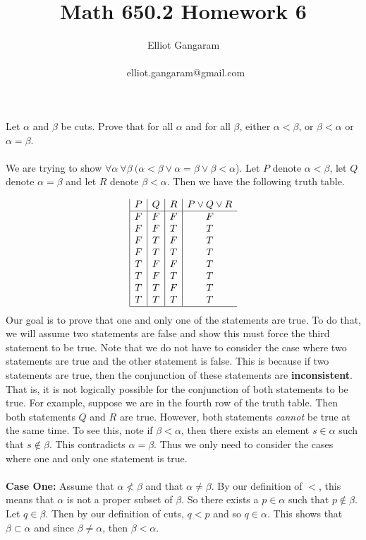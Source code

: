 \documentclass[12pt]{article}
\title{Math 650.2 Homework 6}
\author{Elliot Gangaram\\
\date{}
\ elliot.gangaram@gmail.com \\}
\begin{document}
\maketitle

\problem
Let $\alpha$ and $\beta$ be cuts. Prove that for all $\alpha$ and for all $\beta$, either $\alpha < \beta$, or $\beta < \alpha$ or $\alpha = \beta$.  \\ \\
We are trying to show $\forall \alpha ~ \forall \beta ~ ( \alpha<\beta \lor{} \alpha=\beta \lor{} \beta <\alpha$). Let $P$ denote $\alpha < \beta$, let $Q$ denote  $\alpha = \beta$ and let $R$ denote  $\beta < \alpha$. Then we have the following truth table.

\begin{displaymath}
\begin{array}{|c|c|c|c}
   P
 & Q
 & R
 & P\lor{}Q\lor{}R \\
\hline
F & F & F & F \\
F & F & T & T \\
F & T & F & T \\
F & T & T & T \\
T & F & F & T \\
T & F & T & T \\
T & T & F & T \\
T & T & T & T \\
\hline
\end{array}
\end{displaymath}
Our goal is to prove that one and only one of the statements are true. To do that, we will assume two statements are false and show this must force the third statement to be true. Note that we do not have to consider the case where two statements are true and the other statement is false. This is because if two statements are true, then the conjunction of these statements are \textbf{inconsistent}. That is, it is not logically possible for the conjunction of both statements to be true. For example, suppose we are in the fourth row of the truth table. Then both statements $Q$ and $R$ are true. However, both statements \textsl{cannot}  be true at the same time. To see this, note if $\beta < \alpha$, then there exists an element $s \in \alpha$ such that $s \notin \beta$. This contradicts $\alpha = \beta$. Thus we only need to consider the cases where one and only one statement is true. \\ \\
\textbf{Case One:} Assume that $\alpha \nless \beta$ and that $\alpha \neq \beta$. By our definition of $<$, this means that $\alpha$ is not a proper subset of $\beta$. So there exists a $p \in \alpha$ such that $p \notin \beta$. Let $q \in \beta.$ Then by our definition of cuts, $q<p$ and so $q \in \alpha$. This shows that $\beta \subset \alpha$ and since $\beta \neq \alpha$, then $\beta < \alpha$.\\ \\
\end{document}
